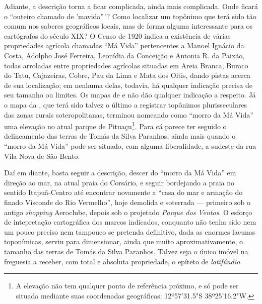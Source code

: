Adiante, a descrição torna a ficar complicada, ainda mais complicada. Onde ficará o ``outeiro chamado de 'mavida'''? Como localizar um topônimo que terá sido tão comum nos saberes geográficos locais, mas de forma alguma interessante para os cartógrafos do século XIX? O Censo de 1920 indica a existência de várias propriedades agrícola chamadas ``Má Vida'' pertencentes a Manoel Ignácio da Costa, Adolpho José Ferreira, Leonídia da Conceição e Antonia R. da Paixão, todas arroladas entre propriedades agrícolas situadas em Areia Branca, Buraco do Tatu, Cajazeiras, Cobre, Pau da Lima e Mata dos Oitis, dando pistas acerca de sua localização; em nenhuma delas, todavia, há qualquer indicação precisa de seu tamanho ou limites. Os mapas de  e  não dão qualquer indicação a respeito. Já o mapa da \cite{salvador_mapa_1969}, que terá sido talvez o último a registrar topônimos plurisseculares das zonas rurais soteropolitanas, terminou nomeando como ``morro da Má Vida'' uma elevação no atual parque de Pituaçu\footnote{A elevação não tem qualquer ponto de referência próximo, e só pode ser situada mediante suas coordenadas geográficas: 12º57'31.5"S 38º25'16.2"W.}. Para cá parece ter seguido o delineamento das terras de Tomás da Silva Paranhos, ainda mais quando o ``morro da Má Vida'' pode ser situado, com alguma liberalidade, a sudeste da rua Vila Nova de São Bento.

Daí em diante, basta seguir a descrição, descer do ``morro da Má Vida'' em direção ao mar, na atual praia do Corsário, e seguir bordejando a praia no sentido Itapuã-Centro até encontrar novamente a ``casa do mar e armação do finado Visconde do Rio Vermelho'', hoje demolida e soterrada --- primeiro sob o antigo \textit{shopping} Aeroclube, depois sob o projetado \textit{Parque dos Ventos}. O esforço de intepretação cartográfica dos marcos indicados, conquanto não tenha sido nem um pouco preciso nem tampouco se pretenda definitivo, dada as enormes lacunas toponímicas, serviu para dimensionar, ainda que muito aproximativamente, o tamanho das terras de Tomás da Silva Paranhos. Talvez seja o único imóvel na freguesia a receber, com total e absoluta propriedade, o epíteto de \textit{latifúndio}. 


